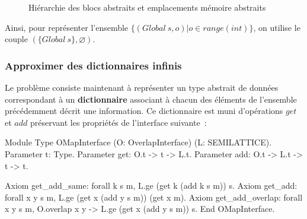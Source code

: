 \documentclass{article}
\newcommand\mi{\mathit}
\begin{document}
\begin{figure}[ht]
{
}
\caption{Hiérarchie des blocs abstraits et emplacements mémoire abstraits}
\label{hierarchy}
\end{figure}

Ainsi, pour représenter l'ensemble $\{(\mi{Global}\ s, o) | o \in
\mi{range(int)}\}$, on utilise le couple $(\{\mi{Global}\ s\}, \varnothing)$.

\subsubsection{Approximer des dictionnaires infinis}

Le problème consiste maintenant à représenter un type abstrait de données
correspondant à un {\bf \gls{dictionnaire}} associant à chacun des éléments de
l'ensemble précédemment décrit une information. Ce dictionnaire est muni
d'opérations $get$ et $add$ préservant les propriétés de
l'interface suivante~:

\begin{coqcode}
\caption{Interface d'un dictionnaire à clés hiérarchiques vers un treillis}
\begin{english}
\begin{coq}
Module Type OMapInterface (O: OverlapInterface) (L: SEMILATTICE).
Parameter t: Type.
Parameter get: O.t -> t -> L.t.
Parameter add: O.t -> L.t -> t -> t.

Axiom get_add_same: forall k s m, L.ge (get k (add k s m)) s.
Axiom get_add: forall x y s m, L.ge (get x (add y s m)) (get x m).
Axiom get_add_overlap: forall x y s m,
  O.overlap x y ->
  L.ge (get x (add y s m)) s.
End OMapInterface.
\end{coq}
\end{english}
\end{coqcode}
\end{document}
